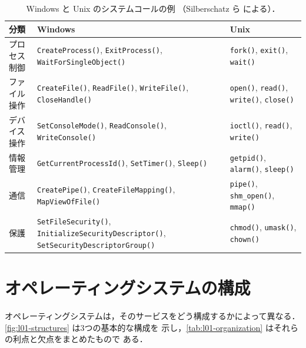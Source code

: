 \documentclass[../main.tex]{subfiles}
\begin{document}
\begin{table}[htbp]
  \centering
  \caption{Windows と Unix のシステムコールの例
    （Silberschatz ら \cite{silberschatz2018} による）．}
  \label{tab:l01-syscalls}
  \small
  \begin{tabular}{@{}>{\raggedright}p{24mm}>{\raggedright}p{55mm}%
      >{\raggedright\arraybackslash}p{32mm}@{}}
    \toprule
    分類 & Windows & Unix \\
    \midrule
    プロセス制御
      & \texttt{CreateProcess()}, \texttt{ExitProcess()},
        \texttt{WaitForSingleObject()}
      & \texttt{fork()}, \texttt{exit()}, \texttt{wait()} \\
    \addlinespace
    ファイル操作
      & \texttt{CreateFile()}, \texttt{ReadFile()}, \texttt{WriteFile()},
        \texttt{CloseHandle()}
      & \texttt{open()}, \texttt{read()}, \texttt{write()},
        \texttt{close()} \\
    \addlinespace
    デバイス操作
      & \texttt{SetConsoleMode()}, \texttt{ReadConsole()},
        \texttt{WriteConsole()}
      & \texttt{ioctl()}, \texttt{read()}, \texttt{write()} \\
    \addlinespace
    情報管理
      & \texttt{GetCurrentProcessId()}, \texttt{SetTimer()},
        \texttt{Sleep()}
      & \texttt{getpid()}, \texttt{alarm()}, \texttt{sleep()} \\
    \addlinespace
    通信
      & \texttt{CreatePipe()}, \texttt{CreateFileMapping()},
        \texttt{MapViewOfFile()}
      & \texttt{pipe()}, \texttt{shm\_open()}, \texttt{mmap()} \\
    \addlinespace
    保護
      & \texttt{SetFileSecurity()}, \texttt{InitializeSecurityDescriptor()},
        \texttt{SetSecurityDescriptorGroup()}
      & \texttt{chmod()}, \texttt{umask()}, \texttt{chown()} \\
    \bottomrule
  \end{tabular}
\end{table}

\section{オペレーティングシステムの構成}
\label{sec:l01-organization}

オペレーティングシステムは，そのサービスをどう構成するかによって異なる．
\cref{fig:l01-structures} は3つの基本的な構成を
示し，\cref{tab:l01-organization} はそれらの利点と欠点をまとめたもので
ある．
\end{document}
